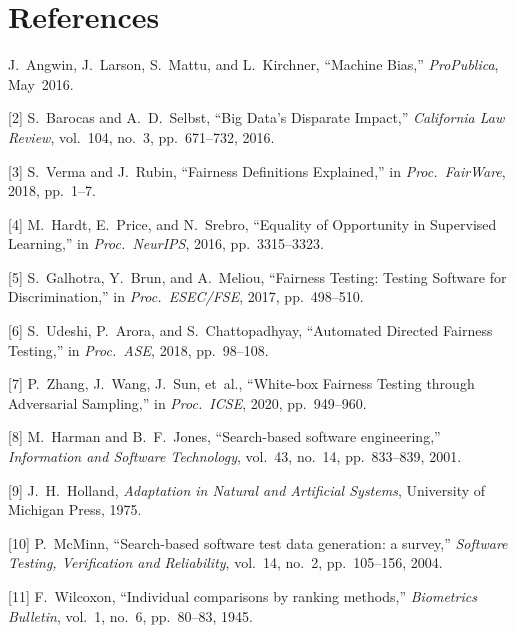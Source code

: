 \documentclass[10pt]{article}
\begin{document}
\section{References}

\begin{small}
[1] J.~Angwin, J.~Larson, S.~Mattu, and L.~Kirchner, ``Machine Bias,''
\textit{ProPublica}, May~2016.

[2] S.~Barocas and A.~D.~Selbst, ``Big Data's Disparate Impact,''
\textit{California Law Review}, vol.~104, no.~3, pp.~671--732, 2016.

[3] S.~Verma and J.~Rubin, ``Fairness Definitions Explained,'' in
\textit{Proc.\ FairWare}, 2018, pp.~1--7.

[4] M.~Hardt, E.~Price, and N.~Srebro, ``Equality of Opportunity in Supervised
Learning,'' in \textit{Proc.\ NeurIPS}, 2016, pp.~3315--3323.

[5] S.~Galhotra, Y.~Brun, and A.~Meliou, ``Fairness Testing: Testing Software for
Discrimination,'' in \textit{Proc.\ ESEC/FSE}, 2017, pp.~498--510.

[6] S.~Udeshi, P.~Arora, and S.~Chattopadhyay, ``Automated Directed Fairness
Testing,'' in \textit{Proc.\ ASE}, 2018, pp.~98--108.

[7] P.~Zhang, J.~Wang, J.~Sun, et~al., ``White-box Fairness Testing through
Adversarial Sampling,'' in \textit{Proc.\ ICSE}, 2020, pp.~949--960.

[8] M.~Harman and B.~F.~Jones, ``Search-based software engineering,''
\textit{Information and Software Technology}, vol.~43, no.~14, pp.~833--839, 2001.

[9] J.~H.~Holland, \textit{Adaptation in Natural and Artificial Systems},
University of Michigan Press, 1975.

[10] P.~McMinn, ``Search-based software test data generation: a survey,''
\textit{Software Testing, Verification and Reliability}, vol.~14, no.~2,
pp.~105--156, 2004.

[11] F.~Wilcoxon, ``Individual comparisons by ranking methods,''
\textit{Biometrics Bulletin}, vol.~1, no.~6, pp.~80--83, 1945.
\end{small}
\end{document}
